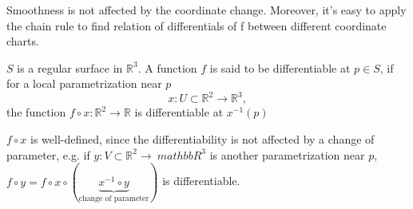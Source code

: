 Smoothness is not affected by the coordinate change. Moreover, it's easy to
apply the chain rule to find relation of differentials of f between
different coordinate charts.
\begin{definition}
    $S$ is a regular surface in $\mathbb{R}^3$. A function $f$ is said to
    be differentiable at $p\in S$, if for a local parametrization near $p$
    \[
        x\colon U\subset \mathbb{R}^2\to \mathbb{R}^3,
    \]
    the function $f\circ x\colon \mathbb{R}^2\to \mathbb{R}$ is
    differentiable at $x^{-1}(p)$
\end{definition}
\begin{remark}
    $f\circ x$ is well-defined, since the differentiability is not affected
    by a change of parameter, e.g. if $y\colon V\subset \mathbb{R}^2\to\
        mathbb{R}^3$ is another parametrization near $p$, $f\circ y=f\circ
        x\circ(\underbrace{x^{-1}\circ y}_{\text{change of parameter}})$ is
    differentiable.
\end{remark}
